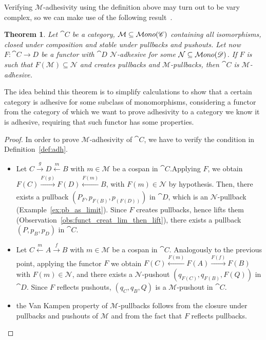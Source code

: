 \documentclass[a4paper, twoside,openright]{report}
\theoremstyle{plain}
\newtheorem{theorem}{Theorem}[section]
\theoremstyle{definition}
\begin{document}

Verifying $\mathcal M$-adhesivity using the definition above may turn out to be vary complex, so we can make use of the following result~\cite{castelnovo2022newcriterionmathcalmmathcalnadhesivity}. 

\begin{theorem}\label{th:crit_for_adh}
    Let $\cat C$ be a category, $\mathcal M \subseteq \mathcal{M}ono(\mathscr{C})$ containing all isomorphisms, closed under composition and stable under pullbacks and pushouts. Let now $F: \cat{C \rightarrow D}$ be a functor with $\cat D$ $\mathcal{N}$-adhesive for some $\mathcal{N} \subseteq \mathcal{M}ono(\mathscr{D})$.
    If $F$ is such that $F(\mathcal{M}) \subseteq \mathcal N$ and creates pullbacks and $\mathcal{M}$-pullbacks, then $\cat C$ is $\mathcal M$-adhesive.
\end{theorem}

The idea behind this theorem is to simplify calculations to show that a certain category is adhesive for some subclass of monomorphisms, considering a functor from the category of which we want to prove adhesivity to a category we know it is adhesive, requiring that such functor has some properties.

\begin{proof}
    In order to prove $\mathcal M$-adhesivity of $\cat C$, we have to verify the condition in Definition~\ref{def:adh}.
    \begin{itemize}
        \item Let $C \xrightarrow[]{g} D \xleftarrow[]{m} B$ with $m \in \mathcal M$ be a cospan in $\cat C$.Applying $F$, we obtain $F(C) \xrightarrow[]{F(g)} F(D) \xleftarrow[]{F(m)} B$, with $F(m) \in \mathcal{N}$ by hypothesis. Then, there exists a pullback $(P_F, p_{F(B)}, p_{(F(D))})$ in $\cat D$, which is an $\mathcal N$-pullback (Example~\ref{ex:pb_as_limit}). Since $F$ creates pullbacks, hence lifts them (Observation~\ref{obs:funct_creat_lim_then_lift}), there exists a pullback $(P, p_B, p_D)$ in $\cat C$.
        \item Let $C \xleftarrow{m} A \xrightarrow{f} B$ with $ m \in \mathcal M$ be a cospan in $\cat C$. Analogously to the previous point, applying the functor $F$ we obtain $F(C) \xleftarrow{F(m)} F(A) \xrightarrow{F(f)} F(B)$ with $ F(m) \in \mathcal N$, and there exists a $\mathcal N$-pushout $(q_{F(C)}, q_{F(B)}, F(Q))$ in $\cat D$. Since $F$ reflects pushouts, $(q_C, q_B, Q)$ is a $\mathcal{M}$-pushout in $\cat C$.
        \item the Van Kampen property of $\mathcal M$-pullbacks follows from the closure under pullbacks and pushouts of $\mathcal M$ and from the fact that $F$ reflects pullbacks.
    \end{itemize}
    
\end{proof}
\end{document}
